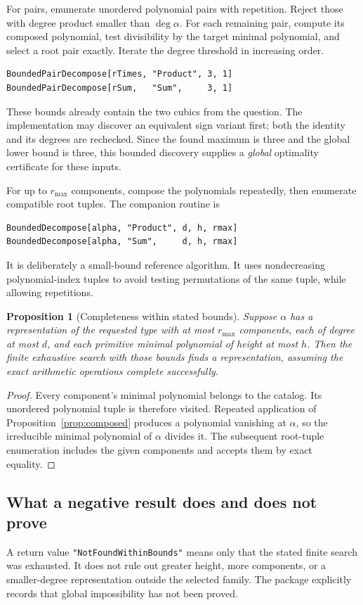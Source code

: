 \documentclass[11pt,a4paper]{article}
\newcommand{\code}[1]{\texttt{#1}}
\newtheorem{proposition}[theorem]{Proposition}
\theoremstyle{definition}
\theoremstyle{remark}
\begin{document}
For pairs, enumerate unordered polynomial pairs with repetition. Reject those with degree product smaller than $\deg\alpha$. For each remaining pair, compute its composed polynomial, test divisibility by the target minimal polynomial, and select a root pair exactly. Iterate the degree threshold in increasing order.
\begin{lstlisting}
BoundedPairDecompose[rTimes, "Product", 3, 1]
BoundedPairDecompose[rSum,   "Sum",     3, 1]
\end{lstlisting}
These bounds already contain the two cubics from the question. The implementation may discover an equivalent sign variant first; both the identity and its degrees are rechecked. Since the found maximum is three and the global lower bound is three, this bounded discovery supplies a \emph{global} optimality certificate for these inputs.

For up to $r_{\max}$ components, compose the polynomials repeatedly, then enumerate compatible root tuples. The companion routine is
\begin{lstlisting}
BoundedDecompose[alpha, "Product", d, h, rmax]
BoundedDecompose[alpha, "Sum",     d, h, rmax]
\end{lstlisting}
It is deliberately a small-bound reference algorithm. It uses nondecreasing polynomial-index tuples to avoid testing permutations of the same tuple, while allowing repetitions.

\begin{proposition}[Completeness within stated bounds]
Suppose $\alpha$ has a representation of the requested type with at most $r_{\max}$ components, each of degree at most $d$, and each primitive minimal polynomial of height at most $h$. Then the finite exhaustive search with those bounds finds a representation, assuming the exact arithmetic operations complete successfully.
\end{proposition}
\begin{proof}
Every component's minimal polynomial belongs to the catalog. Its unordered polynomial tuple is therefore visited. Repeated application of Proposition~\ref{prop:composed} produces a polynomial vanishing at $\alpha$, so the irreducible minimal polynomial of $\alpha$ divides it. The subsequent root-tuple enumeration includes the given components and accepts them by exact equality.
\end{proof}

\subsection{What a negative result does and does not prove}
A return value \code{"NotFoundWithinBounds"} means only that the stated finite search was exhausted. It does not rule out greater height, more components, or a smaller-degree representation outside the selected family. The package explicitly records that global impossibility has not been proved.
\end{document}
